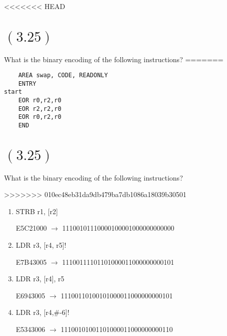 \documentclass[letterpaper,12pt,titlepage]{article}
\begin{document}
<<<<<<< HEAD
\newpage
\section*{$(3.25)$} What is the binary encoding of the following instructions?
=======
\begin{lstlisting}
    AREA swap, CODE, READONLY 
    ENTRY
start
    EOR r0,r2,r0
    EOR r2,r2,r0
    EOR r0,r2,r0    
    END
\end{lstlisting}

\section*{$(3.25)$} What is the binary encoding of the following instructions?

>>>>>>> 010ec48eb31da9db479ba7db1086a18039b30501
\renewcommand{\labelenumi}{\alph{enumi})}
\begin{enumerate}

\item STRB r1, [r2]

\begin{mdframed}[style=MyFrame]
E5C21000 $\rightarrow$ 11100101110000100001000000000000
\end{mdframed}

\item LDR r3, [r4, r5]!

\begin{mdframed}[style=MyFrame]
E7B43005 $\rightarrow$ 11100111101101000011000000000101
\end{mdframed}

\item LDR r3, [r4], r5

\begin{mdframed}[style=MyFrame]
E6943005 $\rightarrow$ 11100110100101000011000000000101
\end{mdframed}

\item LDR r3, [r4,\#-6]! 

\begin{mdframed}[style=MyFrame]
E5343006 $\rightarrow$ 11100101001101000011000000000110
\end{mdframed}

\end{enumerate}
\end{document}
